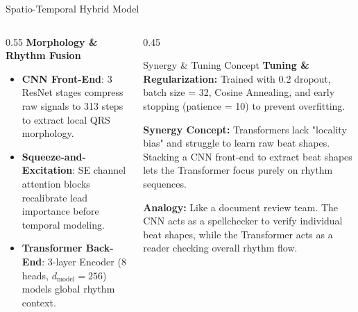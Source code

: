 \documentclass[11pt,aspectratio=169]{beamer}
\begin{document}
\begin{frame}{Spatio-Temporal Hybrid Model}
    \begin{columns}[T]
        \begin{column}{0.55\textwidth}
            \textbf{Morphology \& Rhythm Fusion}
            \begin{itemize}
                \item \textbf{CNN Front-End}: 3 ResNet stages compress raw signals to 313 steps to extract local QRS morphology.
                \item \textbf{Squeeze-and-Excitation}: SE channel attention blocks recalibrate lead importance before temporal modeling.
                \item \textbf{Transformer Back-End}: 3-layer Encoder (8 heads, $d_{\text{model}} = 256$) models global rhythm context.
            \end{itemize}
        \end{column}
        \begin{column}{0.45\textwidth}
            \begin{block}{Synergy \& Tuning Concept}
                \fontsize{8}{9.5}\selectfont
                \textbf{Tuning \& Regularization:} Trained with 0.2 dropout, batch size = 32, Cosine Annealing, and early stopping (patience = 10) to prevent overfitting.
                \vspace{0.12cm}
                
                \textbf{Synergy Concept:} Transformers lack "locality bias" and struggle to learn raw beat shapes. Stacking a CNN front-end to extract beat shapes lets the Transformer focus purely on rhythm sequences.
                \vspace{0.12cm}
                
                \textbf{Analogy:} Like a document review team. The CNN acts as a spellchecker to verify individual beat shapes, while the Transformer acts as a reader checking overall rhythm flow.
            \end{block}
        \end{column}
    \end{columns}
\end{frame}
\end{document}
